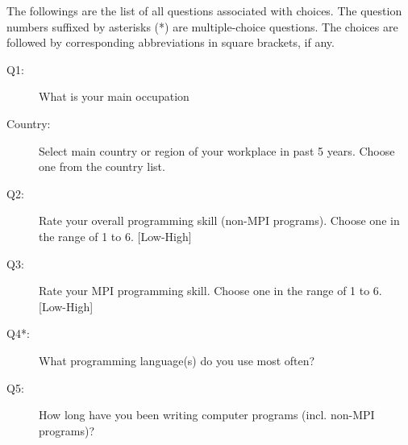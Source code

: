 \documentclass[preprint,5p,times]{elsarticle}
\begin{document}
{The followings are the list of all questions associated with
choices. The question numbers suffixed by asterisks (*) are
multiple-choice questions. The choices are followed by corresponding
abbreviations in square brackets, if any.
\vspace{2mm}
{\footnotesize
  \begin{description}
  \item[Q1:] What is your main occupation
  \item[Country:] \hspace{3mm}Select main country or region of your workplace in past 5 years.
    Choose one from the country list.
  \item[Q2:] Rate your overall programming skill (non-MPI programs).
    Choose one in the range of 1 to 6. [Low-High]
  \item[Q3:] Rate your MPI programming skill.
    Choose one in the range of 1 to 6. [Low-High]
  \item[Q4*:] What programming language(s) do you use most often?
  \item[Q5:] How long have you been writing computer programs (incl. non-MPI programs)?
\end{description}}}
\end{document}
